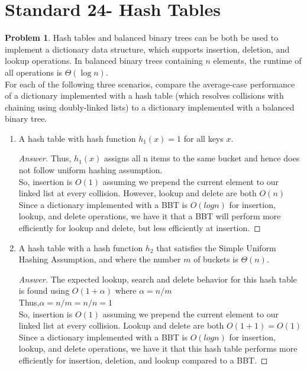 \documentclass[11pt]{article}
\theoremstyle{definition}
\theoremstyle{definition}
\newtheorem{required}{Problem}
\theoremstyle{definition}
\begin{document}
\newpage
\section{Standard 24- Hash Tables}

\begin{required} \label{Hash3}
Hash tables and balanced binary trees can be both be used to implement a dictionary data structure, which supports insertion, deletion, and lookup operations. In balanced binary trees containing $n$ elements, the runtime of all operations is $\Theta(\log n)$.  \\

\noindent For each of the following three scenarios, compare the average-case performance of a dictionary implemented with a hash table (which resolves collisions with chaining using doubly-linked lists) to a dictionary implemented with a balanced binary tree.
	
\begin{enumerate}[label=(\alph*)]
\item A hash table with hash function $h_1(x)=1$ for all keys $x$.

\begin{proof}[Answer]
Thus, $h_1(x)$ assigns all n items to the same bucket and hence does not follow uniform hashing assumption. \\
So, insertion is $O(1)$ assuming we prepend the current element to our linked list at every collision. However, lookup and delete are both $O(n)$ \\
Since a dictionary implemented with a BBT is $O(logn)$ for insertion, lookup, and delete operations, we have it that a BBT will perform more efficiently for lookup and delete, but less efficiently at insertion. 
\end{proof}


\vskip 15pt
\item A hash table with a hash function $h_2$ that satisfies the Simple Uniform Hashing Assumption, and where the number $m$ of buckets is $\Theta(n)$.
\begin{proof}[Answer]
The expected lookup, search and delete behavior for this hash table is found using $O(1+\alpha)$ where $\alpha= n/m$ \\
Thus,$ \alpha= n/m = n/n=1$ \\
So, insertion is $O(1)$ assuming we prepend the current element to our linked list at every collision. Lookup and delete are both $O(1+1)= O(1)$ \\
Since a dictionary implemented with a BBT is $O(logn)$ for insertion, lookup, and delete operations, we have it that this hash table performs more efficiently for insertion, deletion, and lookup compared to a BBT. 


\end{proof}
\end{enumerate}
\end{required}
\end{document}
